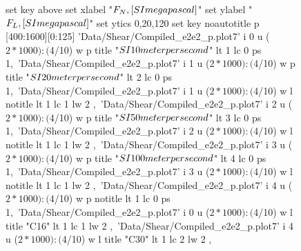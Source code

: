 \documentclass[aps,prb,reprint,superscriptaddress, a4paper]{revtex4-1}
\begin{document}
\begin{figure}
    	\begin{center}
		\begin{gnuplot}[terminal=pdf, terminaloptions={size \SERFigwidth cm, \SERFigheight cm color solid}]
			set key above
			set xlabel "$F_N \\, [\\SI{}{\\mega\\pascal}]$"
			set ylabel "$F_L \\, [\\SI{}{\\mega\\pascal}]$"
			set ytics 0,20,120
			set key noautotitle
            p [400:1600][0:125]	'Data/Shear/Compiled_e2e2_p.plot7' i 0 u ($2*1000):($4/10) w p title "$\\SI{10}{\\meter\\per\\second}$" lt 1 lc 0 ps 1,\
                'Data/Shear/Compiled_e2e2_p.plot7' i 1 u ($2*1000):($4/10) w p title "$\\SI{20}{\\meter\\per\\second}$" lt 2 lc 0 ps 1,\
	    		'Data/Shear/Compiled_e2e2_p.plot7' i 1 u ($2*1000):($4/10) w l notitle  lt 1 lc 1 lw 2	,\
                'Data/Shear/Compiled_e2e2_p.plot7' i 2 u ($2*1000):($4/10) w p title "$\\SI{50}{\\meter\\per\\second}$" lt 3 lc 0 ps 1,\
	    		'Data/Shear/Compiled_e2e2_p.plot7' i 2 u ($2*1000):($4/10) w l notitle  lt 1 lc 1 lw 2	,\
                'Data/Shear/Compiled_e2e2_p.plot7' i 3 u ($2*1000):($4/10) w p title "$\\SI{100}{\\meter\\per\\second}$" lt 4 lc 0 ps 1,\
	    		'Data/Shear/Compiled_e2e2_p.plot7' i 3 u ($2*1000):($4/10) w l notitle  lt 1 lc 1 lw 2 ,\
                'Data/Shear/Compiled_e2e2_p.plot7' i 4 u ($2*1000):($4/10) w p notitle  lt 1 lc 0 ps 1,\
	    		'Data/Shear/Compiled_e2e2_p.plot7' i 0 u ($2*1000):($4/10) w l title "C16" lt 1 lc 1 lw 2 ,\
	    		'Data/Shear/Compiled_e2e2_p.plot7' i 4 u ($2*1000):($4/10) w l title "C30" lt 1 lc 2 lw 2 ,\	    		

\end{gnuplot}
\end{center}
\end{figure}
\end{document}
